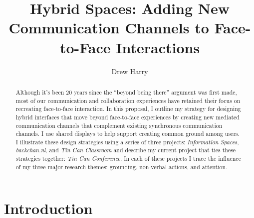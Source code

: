 \documentclass{tufte-handout}
\title{Hybrid Spaces: Adding New Communication Channels to Face-to-Face Interactions}
\author[Drew Harry]{Drew Harry}
\begin{document}
\maketitle%


\begin{abstract}
\noindent Although it's been 20 years since the ``beyond being there'' argument was first made, most of our communication and collaboration experiences have retained their focus on recreating face-to-face interaction. In this proposal, I outline my strategy for designing hybrid interfaces that move beyond face-to-face experiences by creating new mediated communication channels that complement existing synchronous communication channels. I use shared displays to help support creating common ground among users. I illustrate these design strategies using a series of three projects: \emph{Information Spaces}, \emph{backchan.nl}, and \emph{Tin Can Classroom} and describe my current project that ties these strategies together: \emph{Tin Can Conference}. In each of these projects I trace the influence of my three major research themes: grounding, non-verbal actions, and attention.
\end{abstract}



\section{Introduction}



\end{document}
